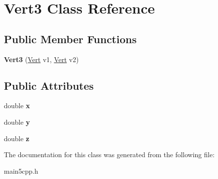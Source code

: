 \hypertarget{class_vert3}{}\section{Vert3 Class Reference}
\label{class_vert3}
\subsection*{Public Member Functions}
\begin{DoxyCompactItemize}
\item 
\mbox{\label{class_vert3_a09911f7edcf7f87c2bd730e6638cc0a6}} 
{\bfseries Vert3} (\mbox{\hyperlink{class_vert}{Vert}} v1, \mbox{\hyperlink{class_vert}{Vert}} v2)
\end{DoxyCompactItemize}
\subsection*{Public Attributes}
\begin{DoxyCompactItemize}
\item 
\mbox{\label{class_vert3_a1b2cd0d7f85932f58fad5765e03fa32e}} 
double {\bfseries x}
\item 
\mbox{\label{class_vert3_adcf98f8e6a291e0895fa81a17b9ae2f0}} 
double {\bfseries y}
\item 
\mbox{\label{class_vert3_a51bc9dcad09b7ed8736f468910ef25fd}} 
double {\bfseries z}
\end{DoxyCompactItemize}


The documentation for this class was generated from the following file\+:\begin{DoxyCompactItemize}
\item 
main5cpp.\+h\end{DoxyCompactItemize}
